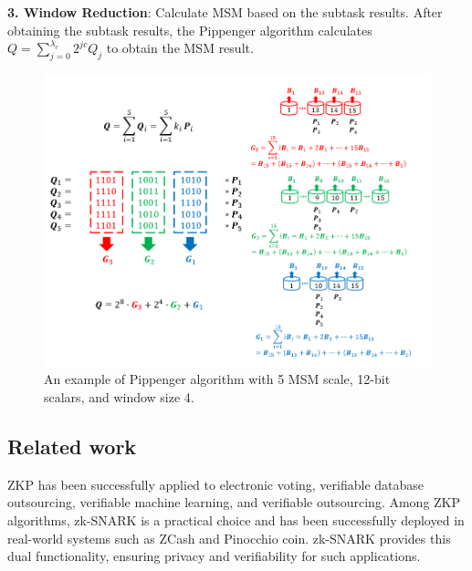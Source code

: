 \documentclass[conference]{IEEEtran}
\begin{document}
\textbf{3. Window Reduction}: Calculate MSM based on the subtask results. After obtaining the subtask results, the Pippenger algorithm calculates $Q = \sum_{j=0}^{\lambda_c} 2^{j c} Q_j$ to obtain the MSM result.




\begin{figure}[h]
\label{fig:pippenger}
\centering
\includegraphics[width=1\linewidth]{image/example-pippenger.png}
\caption{An example of Pippenger algorithm with 5 MSM scale, 12-bit scalars, and window size 4.}
\end{figure}

\subsection{Related work}
\todo{}
ZKP has been successfully applied to electronic voting, verifiable database outsourcing, verifiable machine learning, and verifiable outsourcing. Among ZKP algorithms, zk-SNARK is a practical choice and has been successfully deployed in real-world systems such as ZCash and Pinocchio coin. zk-SNARK provides this dual functionality, ensuring privacy and verifiability for such applications. 
\end{document}
